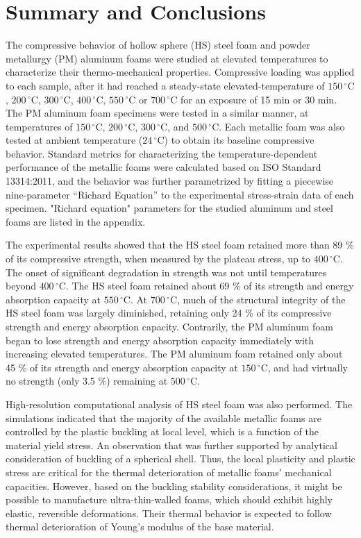 \documentclass[review]{elsarticle}
\begin{document}
{\section{Summary and Conclusions}

The compressive behavior of hollow sphere (HS) steel foam and powder metallurgy (PM) aluminum foams were studied at elevated temperatures to characterize their thermo-mechanical properties. Compressive loading was applied to each sample, after it had reached a steady-state elevated-temperature of $150\,^{\circ}\mathrm{C}$, $200\,^{\circ}\mathrm{C}$, $300\,^{\circ}\mathrm{C}$, $400\,^{\circ}\mathrm{C}$, $550\,^{\circ}\mathrm{C}$ or $700\,^{\circ}\mathrm{C}$ for an exposure of 15 min or 30 min. The PM aluminum foam specimens were tested in a similar manner, at temperatures of $150\,^{\circ}\mathrm{C}$, $200\,^{\circ}\mathrm{C}$, $300\,^{\circ}\mathrm{C}$, and $500\,^{\circ}\mathrm{C}$. Each metallic foam was also tested at ambient temperature ($24\,^{\circ}\mathrm{C}$) to obtain its baseline compressive behavior. Standard metrics for characterizing the temperature-dependent performance of the metallic foams were calculated based on ISO Standard 13314:2011, and the behavior was further parametrized by fitting a piecewise nine-parameter “Richard Equation” to the experimental stress-strain data of each specimen. "Richard equation" parameters for the studied aluminum and steel foams are listed in the appendix.

The experimental results showed that the HS steel foam retained more than 89 \% of its compressive strength, when measured by the plateau stress, up to $400\,^{\circ}\mathrm{C}$. The onset of significant degradation in strength was not until temperatures beyond $400\,^{\circ}\mathrm{C}$. The HS steel foam retained about 69 \% of its strength and energy absorption capacity at $550\,^{\circ}\mathrm{C}$. At $700\,^{\circ}\mathrm{C}$, much of the structural integrity of the HS steel foam was largely diminished, retaining only 24 \% of its compressive strength and energy absorption capacity. Contrarily, the PM aluminum foam began to lose strength and energy absorption capacity immediately with increasing elevated temperatures. The PM aluminum foam retained only about 45 \% of its strength and energy absorption capacity at $150\,^{\circ}\mathrm{C}$, and had virtually no strength (only 3.5 \%) remaining at $500\,^{\circ}\mathrm{C}$.

High-resolution computational analysis of HS steel foam was also performed. The simulations indicated that the majority of the available metallic foams are controlled by the plastic buckling at local level, which is a function of the material yield stress. An observation that was further supported by analytical consideration of buckling of a spherical shell. Thus, the local plasticity and plastic stress are critical for the thermal deterioration of metallic foams’ mechanical capacities. However, based on the buckling stability considerations, it might be possible to manufacture ultra-thin-walled foams, which should exhibit highly elastic, reversible deformations. Their thermal behavior is expected to follow thermal deterioration of Young's modulus of the base material.

}
\end{document}

